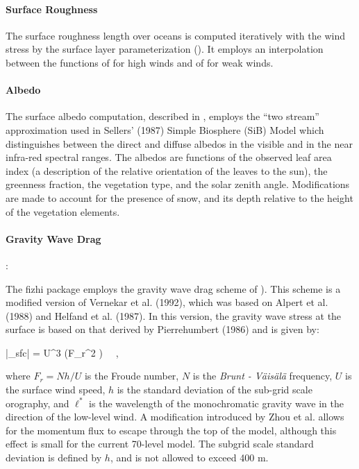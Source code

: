 \paragraph{Surface Roughness}
The surface roughness length over oceans is computed iteratively with the wind
stress by the surface layer parameterization (\cite{helfschu:95}).
It employs an interpolation between the functions of \cite{larpond:81}
for high winds and of \cite{kondo:75} for weak winds.


\paragraph{Albedo}
The surface albedo computation, described in \cite{ks:91},
employs the ``two stream'' approximation used in Sellers' (1987) Simple Biosphere (SiB)
Model which distinguishes between the direct and diffuse albedos in the visible
and in the near infra-red spectral ranges. The albedos are functions of the observed
leaf area index (a description of the relative orientation of the leaves to the
sun), the greenness fraction, the vegetation type, and the solar zenith angle.
Modifications are made to account for the presence of snow, and its depth relative
to the height of the vegetation elements.

\paragraph{Gravity Wave Drag}:

The fizhi package employs the gravity wave drag scheme of \cite{zhouetal:95}).
This scheme is a modified version of Vernekar et al. (1992),
which was based on Alpert et al. (1988) and Helfand et al. (1987).  
In this version, the gravity wave stress at the surface is
based on that derived by Pierrehumbert (1986) and is given by:

\bq
|\vec{\tau}_{sfc}| = {\rho U^3} \left(F_r^2 \right) \, \, ,
\eq

where $F_r = N h /U$ is the Froude number, $N$ is the {\em Brunt - V\"{a}is\"{a}l\"{a}} frequency, $U$ is the 
surface wind speed, $h$ is the standard deviation of the sub-grid scale orography,
and $\ell^*$ is the wavelength of the monochromatic gravity wave in the direction of the low-level wind.
A modification introduced by Zhou et al. allows for the momentum flux to
escape through the top of the model, although this effect is small for the current 70-level model.  
The subgrid scale standard deviation is defined by $h$, and is not allowed to exceed 400 m. 

